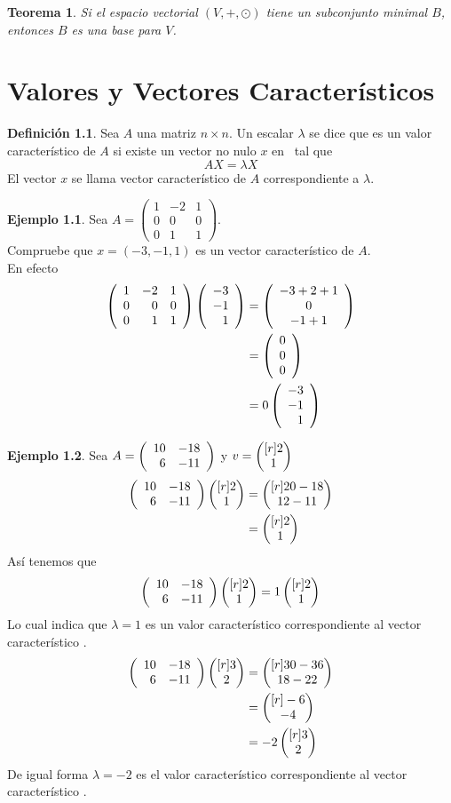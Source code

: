 \documentclass[10pt,a4paper]{report}
\newtheorem{theorem}{Teorema}[chapter]
\theoremstyle{definition}
\newtheorem{dfn}{Definición}[chapter]
\newtheorem{ejemplo}{Ejemplo}[chapter]
\theoremstyle{remark}
\numberwithin{section}{chapter}
\numberwithin{equation}{chapter}
\numberwithin{tacounter}{chapter}
\begin{document}
\begin{theorem}
Si el espacio vectorial $(V , +, \odot)$ tiene un subconjunto minimal $B$, entonces $B$ es una base para $V$.
\end{theorem}


\chapter{Valores y Vectores Característicos}
\begin{dfn}
Sea $A$ una matriz $n\times n$. Un escalar $\lambda$ se dice que es un valor característico de $A$ si existe un vector no nulo $x$ en \rn \ tal que
$$A X = \lambda X$$
El vector $x$ se llama vector característico de $A$ correspondiente a $\lambda$.
\end{dfn}

\begin{ejemplo}
Sea $A = \left( \begin{array}{rrr}
1 & -2 & 1\\
0 & 0 & 0\\
0 & 1 & 1
\end{array} \right)$.\\
Compruebe que $x= (-3, -1, 1)$ es un vector característico de $A$.\\

\noindent En efecto 
\begin{align*}
\left( \begin{array}{rrr}
1 & -2 &1\\
0 & 0 & 0\\
0&1&1
\end{array} \right)
\left( \begin{array}{r} -3\\ -1\\ 1 \end{array} \right)  &=
\left( \begin{array}{c}
-3+2+1\\
0\\
-1+1
\end{array} \right)\\
&= \left( \begin{array}{r} 0\\ 0\\ 0 \end{array} \right) \\
&= 0 \left( \begin{array}{r} -3\\ -1\\ 1 \end{array} \right) 
\end{align*}
\end{ejemplo}

\begin{ejemplo}
Sea $A = \left( \begin{array}{rr} 10 & -18\\ 6 & -11 \end{array} \right) $ y $v= \begin{pmatrix}[r] 2\\ 1\\ \end{pmatrix} $\\
\begin{align*}
 \left( \begin{array}{rr} 10 & -18\\ 6 & -11 \end{array} \right)  \begin{pmatrix}[r] 2\\ 1\\ \end{pmatrix}  &= \begin{pmatrix}[r] 20-18\\ 12-11\\ \end{pmatrix} \\
&= \begin{pmatrix}[r] 2\\ 1\\ \end{pmatrix} 
\end{align*}
Así tenemos que 
$$ \left( \begin{array}{rr} 10 & -18\\ 6 & -11 \end{array} \right)  \begin{pmatrix}[r] 2\\ 1\\ \end{pmatrix}  = 1 \begin{pmatrix}[r] 2\\ 1\\ \end{pmatrix} $$
Lo cual indica que $\lambda = 1$ es un valor característico correspondiente al vector característico .
\begin{align*}
 \left( \begin{array}{rr} 10 & -18\\ 6 & -11 \end{array} \right)  \begin{pmatrix}[r] 3\\ 2\\ \end{pmatrix}  &= \begin{pmatrix}[r] 30-36\\ 18-22\\ \end{pmatrix} \\
&= \begin{pmatrix}[r] -6\\ -4\\ \end{pmatrix} \\
&= -2 \begin{pmatrix}[r] 3\\ 2\\ \end{pmatrix} 
\end{align*}
De igual forma $\lambda = -2$ es el valor característico correspondiente al vector característico .
\end{ejemplo}
\end{document}
